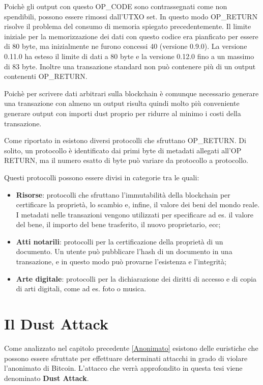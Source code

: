 Poichè gli output con questo OP\_CODE sono contrassegnati come non spendibili, possono essere rimossi dall'UTXO set. In questo modo OP\_RETURN risolve il problema del consumo di memoria spiegato precedentemente. Il limite iniziale per la memorizzazione dei dati con questo codice era pianficato per essere di 80 byte, ma inizialmente ne furono concessi 40 (versione 0.9.0).  La versione 0.11.0 \cite{v11} ha esteso il limite di dati a 80 byte e la versione 0.12.0 \cite{v12} fino a un massimo di 83 byte. Inoltre una transazione standard non può contenere più di un output contenenti OP\_RETURN.

Poichè per scrivere dati arbitrari sulla blockchain è comunque necessario generare una transazione con almeno un output risulta quindi molto più conveniente generare output con importi dust proprio per ridurre al minimo i costi della transazione.

Come riportato in \cite{OP_RETURN} esistono diversi protocolli che sfruttano OP\_RETURN. Di solito, un protocollo è identificato dai primi byte di metadati allegati all'OP RETURN, ma il numero esatto di byte può variare da protocollo a protocollo. 

Questi protocolli possono essere divisi in categorie tra le quali:
\begin{itemize}
    \item \textbf{Risorse}: protocolli che sfruttano l'immutabilità della blockchain per certificare la proprietà, lo scambio e, infine, il valore dei beni del mondo reale. I metadati nelle transazioni vengono utilizzati per specificare ad es. il valore del bene, il importo del bene trasferito, il nuovo proprietario, ecc;  
    \item \textbf{Atti notarili}: protocolli per la certificazione della proprietà di un documento. Un utente può pubblicare l'hash di un documento in una transazione, e in questo modo può provarne l'esistenza e l'integrità;
    \item \textbf{Arte digitale}: protocolli per la dichiarazione dei diritti di accesso e di copia di arti digitali, come ad es. foto o musica.
\end{itemize}

\section{Il Dust Attack}\label{dstatt}
Come analizzato nel capitolo precedente \ref{Anonimato} esistono delle euristiche che possono essere sfruttate per effettuare determinati attacchi in grado di violare l'anonimato di Bitcoin. L'attacco che verrà approfondito in questa tesi viene denominato \textbf{Dust Attack}. 

